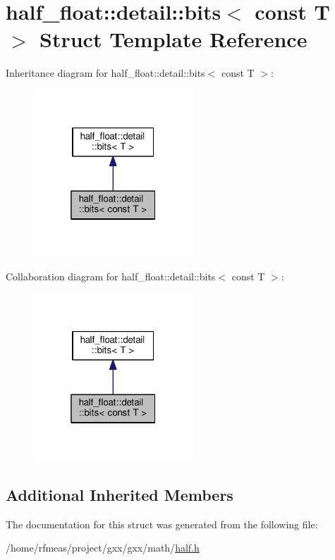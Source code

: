 \hypertarget{structhalf__float_1_1detail_1_1bits_3_01const_01T_01_4}{}\section{half\+\_\+float\+:\+:detail\+:\+:bits$<$ const T $>$ Struct Template Reference}
\label{structhalf__float_1_1detail_1_1bits_3_01const_01T_01_4}


Inheritance diagram for half\+\_\+float\+:\+:detail\+:\+:bits$<$ const T $>$\+:
\nopagebreak
\begin{figure}[H]
\begin{center}
\leavevmode
\includegraphics[width=169pt]{structhalf__float_1_1detail_1_1bits_3_01const_01T_01_4__inherit__graph}
\end{center}
\end{figure}


Collaboration diagram for half\+\_\+float\+:\+:detail\+:\+:bits$<$ const T $>$\+:
\nopagebreak
\begin{figure}[H]
\begin{center}
\leavevmode
\includegraphics[width=169pt]{structhalf__float_1_1detail_1_1bits_3_01const_01T_01_4__coll__graph}
\end{center}
\end{figure}
\subsection*{Additional Inherited Members}


The documentation for this struct was generated from the following file\+:\begin{DoxyCompactItemize}
\item 
/home/rfmeas/project/gxx/gxx/math/\hyperlink{half_8h}{half.\+h}\end{DoxyCompactItemize}
